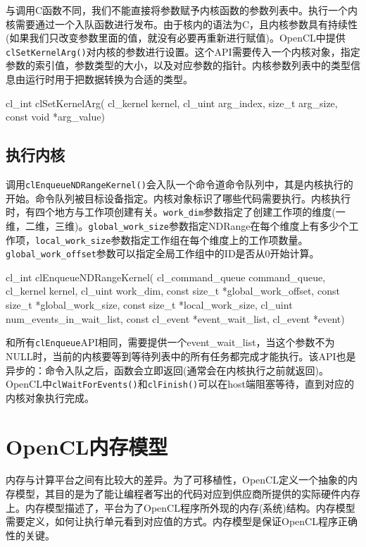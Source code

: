 与调用C函数不同，我们不能直接将参数赋予内核函数的参数列表中。执行一个内核需要通过一个入队函数进行发布。由于核内的语法为C，且内核参数具有持续性(如果我们只改变参数里面的值，就没有必要再重新进行赋值)。OpenCL中提供\texttt{clSetKernelArg()}对内核的参数进行设置。这个API需要传入一个内核对象，指定参数的索引值，参数类型的大小，以及对应参数的指针。内核参数列表中的类型信息由运行时用于把数据转换为合适的类型。

\begin{codebox}[cpp]
cl_int
clSetKernelArg(
  cl_kernel kernel,
  cl_uint arg_index,
  size_t arg_size,
  const void *arg_value)
\end{codebox}

\subsection{执行内核}

调用\texttt{clEnqueueNDRangeKernel()}会入队一个命令道命令队列中，其是内核执行的开始。命令队列被目标设备指定。内核对象标识了哪些代码需要执行。内核执行时，有四个地方与工作项创建有关。\texttt{work\_dim}参数指定了创建工作项的维度(一维，二维，三维)。\texttt{global\_work\_size}参数指定NDRange在每个维度上有多少个工作项，\texttt{local\_work\_size}参数指定工作组在每个维度上的工作项数量。\texttt{global\_work\_offset}参数可以指定全局工作组中的ID是否从0开始计算。

\begin{codebox}[cpp]
cl_int
clEnqueueNDRangeKernel(
  cl_command_queue command_queue,
  cl_kernel kernel,
  cl_uint work_dim,
  const size_t *global_work_offset,
  const size_t *global_work_size,
  const size_t *local_work_size,
  cl_uint num_events_in_wait_list,
  const cl_event *event_wait_list,
  cl_event *event)
\end{codebox}

和所有\texttt{clEnqueue}API相同，需要提供一个event\_\allowbreak{}wait\_\allowbreak{}list，当这个参数不为NULL时，当前的内核要等到等待列表中的所有任务都完成才能执行。该API也是异步的：命令入队之后，函数会立即返回(通常会在内核执行之前就返回)。OpenCL中\texttt{clWaitForEvents()}和\texttt{clFinish()}可以在host端阻塞等待，直到对应的内核对象执行完成。



\section{OpenCL内存模型}

内存与计算平台之间有比较大的差异。为了可移植性，OpenCL定义一个抽象的内存模型，其目的是为了能让编程者写出的代码对应到供应商所提供的实际硬件内存上。内存模型描述了，平台为了OpenCL程序所外现的内存(系统)结构。内存模型需要定义，如何让执行单元看到对应值的方式。内存模型是保证OpenCL程序正确性的关键。


